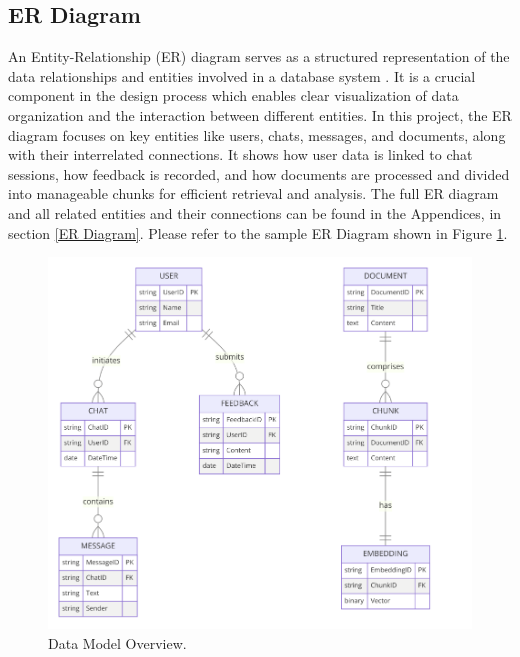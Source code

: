 \documentclass{l4proj}
\begin{document}
\subsection{ER Diagram}

An Entity-Relationship (ER) diagram serves as a structured representation of the data relationships and entities involved in a database system \citep{erdiagram}. It is a crucial component in the design process which enables clear visualization of data organization and the interaction between different entities. In this project, the ER diagram focuses on key entities like users, chats, messages, and documents, along with their interrelated connections. It shows how user data is linked to chat sessions, how feedback is recorded, and how documents are processed and divided into manageable chunks for efficient retrieval and analysis. The full ER diagram and all related entities and their connections can be found in the Appendices, in section \ref{ER Diagram}. Please refer to the sample ER Diagram shown in Figure \ref{fig:ER Diagram Partial}.    

\begin{figure}[h!]
  \centering
  \begin{adjustbox}{center,max height=0.43\textheight, max width=\linewidth}
    \includegraphics{images/partialerdiagram.png}
  \end{adjustbox}
  \caption{Data Model Overview.}
  \label{fig:ER Diagram Partial}
\end{figure}
\end{document}
